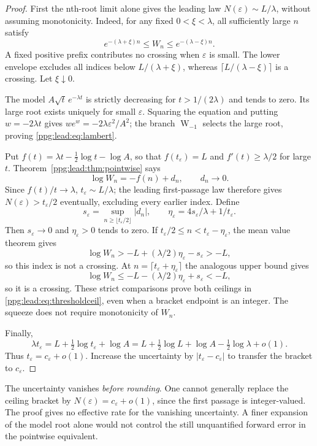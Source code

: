 \documentclass[11pt,letterpaper]{article}
\theoremstyle{remark}\newtheorem{remark}[theorem]{Remark}
\numberwithin{equation}{section}
\begin{document}
\begin{proof}
First the nth-root limit alone gives the leading law
$N(\varepsilon)\sim L/\lambda$, without assuming monotonicity. Indeed, for any fixed $0<\xi<\lambda$, all sufficiently large $n$ satisfy
\[
 e^{-(\lambda+\xi)n}\le W_n\le e^{-(\lambda-\xi)n}.
\]
A fixed positive prefix contributes no crossing when $\varepsilon$ is small. The lower envelope excludes all indices below $L/(\lambda+\xi)$, whereas $\lceil L/(\lambda-\xi)\rceil$ is a crossing. Let $\xi\downarrow0$.

The model $A\sqrt t\,e^{-\lambda t}$ is strictly decreasing for $t>1/(2\lambda)$ and tends to zero. Its large root exists uniquely for small $\varepsilon$. Squaring the equation and putting $w=-2\lambda t$ gives $we^w=-2\lambda\varepsilon^2/A^2$; the branch $\operatorname W_{-1}$ selects the large root, proving \eqref{ppg:lead:eq:lambert}.

Put $f(t)=\lambda t-\tfrac12\log t-\log A$, so that
$f(t_\varepsilon)=L$ and $f'(t)\ge\lambda/2$ for large $t$.
Theorem~\ref{ppg:lead:thm:pointwise} says
\[
 \log W_n=-f(n)+d_n,\qquad d_n\longrightarrow0.
\]
Since $f(t)/t\to\lambda$, $t_\varepsilon\sim L/\lambda$; the leading first-passage law therefore gives $N(\varepsilon)>t_\varepsilon/2$ eventually, excluding every earlier index. Define
\[
 s_\varepsilon=\sup_{n\ge\lfloor t_\varepsilon/2\rfloor}|d_n|,
 \qquad \eta_\varepsilon=4s_\varepsilon/\lambda+1/t_\varepsilon.
\]
Then $s_\varepsilon\to0$ and $\eta_\varepsilon>0$ tends to zero. If
$t_\varepsilon/2\le n<t_\varepsilon-\eta_\varepsilon$, the mean value theorem gives
\[
 \log W_n>-L+(\lambda/2)\eta_\varepsilon-s_\varepsilon>-L,
\]
so this index is not a crossing. At
$n=\lceil t_\varepsilon+\eta_\varepsilon\rceil$ the analogous upper bound gives
\[
 \log W_n\le-L-(\lambda/2)\eta_\varepsilon+s_\varepsilon<-L,
\]
so it is a crossing. These strict comparisons prove both ceilings in \eqref{ppg:lead:eq:thresholdceil}, even when a bracket endpoint is an integer. The squeeze does not require monotonicity of $W_n$.

Finally,
\[
 \lambda t_\varepsilon=L+\tfrac12\log t_\varepsilon+\log A
 =L+\tfrac12\log L+\log A-\tfrac12\log\lambda+o(1).
\]
Thus $t_\varepsilon=c_\varepsilon+o(1)$. Increase the uncertainty by
$|t_\varepsilon-c_\varepsilon|$ to transfer the bracket to $c_\varepsilon$.
\end{proof}

The uncertainty vanishes \emph{before rounding}. One cannot generally replace the ceiling bracket by $N(\varepsilon)=c_\varepsilon+o(1)$, since the first passage is integer-valued. The proof gives no effective rate for the vanishing uncertainty. A finer expansion of the model root alone would not control the still unquantified forward error in the pointwise equivalent.
\end{document}
